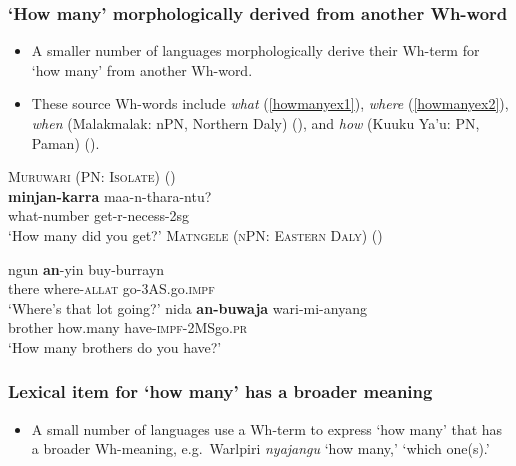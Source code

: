 \documentclass{article}
\begin{document}
\subsubsection{`How many' morphologically derived from another Wh-word}

\begin{itemize}
\item A smaller number of languages morphologically derive their Wh-term for `how many' from another Wh-word.
\item These source Wh-words include \textit{what} (\ref{howmanyex1}), \textit{where} (\ref{howmanyex2}), \textit{when} (Malakmalak: nPN, Northern Daly) (\citealt[17]{tryon74}), and \textit{how} (Kuuku Ya'u: PN, Paman) (\citealt[91]{thompson88}).
\end{itemize}

\begin{exe}
  \ex \label{howmanyex1} \textsc{Muruwari (PN: Isolate)} (\citealt[122]{oates88})\\
  \gll \textbf{minjan-karra} maa-n-thara-ntu?\\
  what-number get-{\sc r-necess-2sg}\\
  \glt `How many did you get?' %
  \ex \label{howmanyex2} \textsc{Matngele (nPN: Eastern Daly)} (\citealt[51]{zandvoort99})
  \begin{xlist}
    \ex \gll ngun \textbf{an}-yin buy-burrayn\\
    there where-\textsc{allat} go-3AS.go.\textsc{impf}\\
    \glt `Where's that lot going?' %
    \ex \gll nida \textbf{an-buwaja} wari-mi-anyang\\
    brother how.many have-\textsc{impf}-2MSgo.\textsc{pr}\\
    \glt `How many brothers do you have?' %
  \end{xlist}
\end{exe}

\subsubsection{Lexical item for `how many' has a broader meaning}

\begin{itemize}
\item A small number of languages use a Wh-term to express `how many' that has a broader Wh-meaning, e.g.\ Warlpiri \textit{nyajangu} `how many,' `which one(s).'
\end{itemize}
\end{document}
